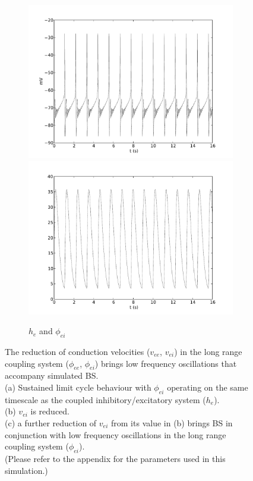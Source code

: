 \documentclass[a4paper,12pt]{article}
\begin{document}
\begin{figure}
	\begin{subfigure}[b]{1\textwidth}
		\includegraphics[scale=0.32]{frontiers-2012-images-revised/biphasic-gamma_yml-00214_ode-phi-burst-split-v-1-0_03-5-0_5_yml-he-phi.pdf}
		\includegraphics[scale=0.32]{frontiers-2012-images-revised/biphasic-gamma_yml-00214_ode-phi-burst-split-v-1-0_03-5-0_5_yml-phi_ei-phi.pdf}
		\caption{$h_e$ and $\phi_{ei}$}
	\end{subfigure}
	\label{fig:phi_dyn}
	\caption{The reduction of conduction velocities ($v_{ee}$, $v_{ei}$) in the long range coupling system ($\phi_{ee}$, $\phi_{ei}$) brings low frequency oscillations that accompany simulated BS. \\
	(a) Sustained limit cycle behaviour with $\phi_{ei}$ operating on the same timescale as the coupled inhibitory/excitatory system ($h_e$).\\
           (b) $v_{ei}$ is reduced.\\
 (c) a further reduction of $v_{ei}$ from its value in (b) brings BS in conjunction with low frequency oscillations in the long range coupling system ($\phi_{ei}$).\\
(Please refer to the appendix for the parameters used in this simulation.)}
\end{figure}
\end{document}
